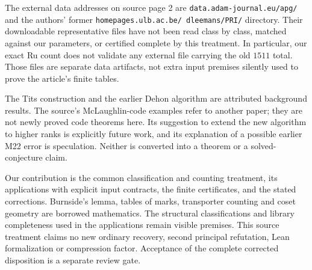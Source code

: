 \documentclass[11pt]{article}
\begin{document}
The external data addresses on source page 2 are
\texttt{data.adam-journal.eu/apg/} and the authors' former
\texttt{homepages.ulb.ac.be/\string~dleemans/PRI/} directory. Their downloadable
representative files have not been read class by class, matched against
our parameters, or certified complete by this treatment. In particular,
our exact Ru count does not validate any external file carrying the old
$1511$ total. Those files are separate data artifacts, not extra input
premises silently used to prove the article's finite tables.

The Tits construction and the earlier Dehon algorithm are attributed
background results. The source's McLaughlin-code examples refer to another
paper; they are not newly proved code theorems here. Its suggestion to
extend the new algorithm to higher ranks is explicitly future work, and
its explanation of a possible earlier M22 error is speculation. Neither
is converted into a theorem or a solved-conjecture claim.

Our contribution is the common classification and counting treatment,
its applications with explicit input contracts, the finite certificates,
and the stated corrections. Burnside's lemma, tables of marks, transporter
counting and coset geometry are borrowed mathematics. The structural
classifications and library completeness used in the applications remain
visible premises. This source treatment claims no new ordinary recovery,
second principal refutation, Lean formalization or compression factor.
Acceptance of the complete corrected disposition is a separate review gate.
\end{document}
